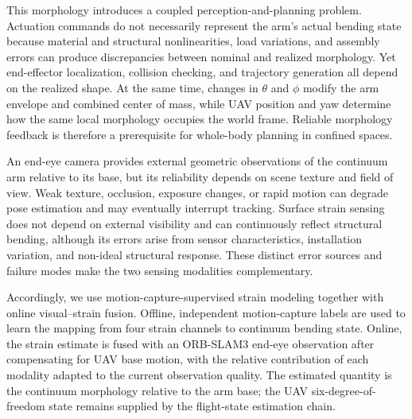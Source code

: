 \documentclass[journal,twoside]{IEEEtran}
\begin{document}
This morphology introduces a coupled perception-and-planning problem. Actuation commands do not necessarily represent the arm's actual bending state because material and structural nonlinearities, load variations, and assembly errors can produce discrepancies between nominal and realized morphology. Yet end-effector localization, collision checking, and trajectory generation all depend on the realized shape. At the same time, changes in $\theta$ and $\phi$ modify the arm envelope and combined center of mass, while UAV position and yaw determine how the same local morphology occupies the world frame. Reliable morphology feedback is therefore a prerequisite for whole-body planning in confined spaces.

An end-eye camera provides external geometric observations of the continuum arm relative to its base, but its reliability depends on scene texture and field of view. Weak texture, occlusion, exposure changes, or rapid motion can degrade pose estimation and may eventually interrupt tracking. Surface strain sensing does not depend on external visibility and can continuously reflect structural bending, although its errors arise from sensor characteristics, installation variation, and non-ideal structural response. These distinct error sources and failure modes make the two sensing modalities complementary.

Accordingly, we use motion-capture-supervised strain modeling together with online visual--strain fusion. Offline, independent motion-capture labels are used to learn the mapping from four strain channels to continuum bending state. Online, the strain estimate is fused with an ORB-SLAM3 end-eye observation after compensating for UAV base motion, with the relative contribution of each modality adapted to the current observation quality. The estimated quantity is the continuum morphology relative to the arm base; the UAV six-degree-of-freedom state remains supplied by the flight-state estimation chain.
\end{document}
